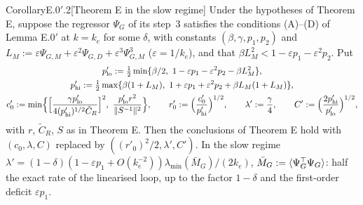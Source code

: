\begin{thm}{Corollary}{E.0$'$.2}[Theorem E in the slow regime]
Under the hypotheses of Theorem E, suppose the regressor $\Psi_G$ of its step~3 satisfies the conditions (A)--(D) of
Lemma E.0$'$ at $k=k_e$ for some $\delta$, with constants $(\beta,\gamma,p_1,p_2)$ and
$L_M:=\varepsilon\Psi_{G,M}+\varepsilon^2\Psi_{G,D}+\varepsilon^3\Psi_{G,M}^3$ ($\varepsilon=1/k_e$), and that
$\beta L_M^2<1-\varepsilon p_1-\varepsilon^2p_2$. Put
\begin{gather*}
  p'_{\mathrm{lo}}:=\tfrac12\min\{\beta/2,\ 1-\varepsilon p_1-\varepsilon^2p_2-\beta L_M^2\},\\
  p'_{\mathrm{hi}}:=\tfrac12\max\{\beta(1+L_M),\ 1+\varepsilon p_1+\varepsilon^2p_2+\beta L_M(1+L_M)\},\\
  c'_0:=\min\Bigl\{\Bigl[\frac{\gamma p'_{\mathrm{lo}}}{4(p'_{\mathrm{hi}})^{1/2}\tilde C_R}\Bigr]^2,\
  \frac{p'_{\mathrm{lo}}r^2}{\lVert S^{-1}\rVert^2}\Bigr\},\qquad
  r'_0:=\Bigl(\frac{c'_0}{p'_{\mathrm{hi}}}\Bigr)^{1/2},\qquad \lambda':=\frac\gamma4,\qquad
  C':=\Bigl(\frac{2p'_{\mathrm{hi}}}{p'_{\mathrm{lo}}}\Bigr)^{1/2},
\end{gather*}
with $r$, $\tilde C_R$, $S$ as in Theorem E. Then the conclusions of Theorem E hold with $(c_0,\lambda,C)$ replaced by
$((r'_0)^2/2,\lambda',C')$. In the slow regime
$\lambda'=(1-\delta)(1-\varepsilon p_1+O(k_e^{-2}))\lambda_{\min}(\bar M_G)/(2k_e)$,
$\bar M_G:=\langle\Psi_G^\top\Psi_G\rangle$: half the exact rate of the linearised loop, up to the factor $1-\delta$ and
the first-order deficit $\varepsilon p_1$.
\end{thm}

